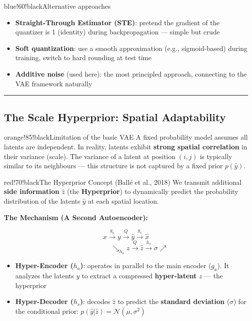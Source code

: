 \begin{calloutbox}{blue!60!black}{Alternative approaches}
\begin{itemize}
\item \textbf{Straight-Through Estimator (STE)}: pretend the gradient of the quantizer is 1 (identity) during backpropagation — simple but crude
\item \textbf{Soft quantization}: use a smooth approximation (e.g., sigmoid-based) during training, switch to hard rounding at test time
\item \textbf{Additive noise} (used here): the most principled approach, connecting to the VAE framework naturally
\end{itemize}
\end{calloutbox}

\bigskip\hrule\bigskip

\subsection{The Scale Hyperprior: Spatial Adaptability}

\begin{calloutbox}{orange!85!black}{Limitation of the basic VAE}
A fixed probability model assumes all latents are independent. In reality, latents exhibit \textbf{strong spatial correlation} in their variance (scale). The variance of a latent at position $(i,j)$ is typically similar to its neighbours — this structure is not captured by a fixed prior $p(\hat{y})$.
\end{calloutbox}

\begin{calloutbox}{red!70!black}{The Hyperprior Concept (Ballé et al., 2018)}
We transmit additional \textbf{side information} $\hat{z}$ (the \textbf{Hyperprior}) to dynamically predict the probability distribution of the latents $\hat{y}$ at each spatial location.
\end{calloutbox}

\textbf{The Mechanism (A Second Autoencoder):}

\[
x \xrightarrow{g_a} y \xrightarrow{Q} \hat{y} \xrightarrow{g_s} \hat{x}
\]
\[
\quad\quad\quad\quad \searrow_{h_a} z \xrightarrow{Q} \hat{z} \xrightarrow{h_s} \sigma \nearrow
\]

\begin{itemize}
\item \textbf{Hyper-Encoder ($h_a$)}: operates in parallel to the main encoder ($g_a$). It analyzes the latents $y$ to extract a compressed \textbf{hyper-latent} $z$ — the hyperprior
\item \textbf{Hyper-Decoder ($h_s$)}: decodes $\hat{z}$ to predict the \textbf{standard deviation} ($\sigma$) for the conditional prior: $p(\hat{y}|\hat{z}) = \mathcal{N}(\mu, \sigma^2)$
\end{itemize}

